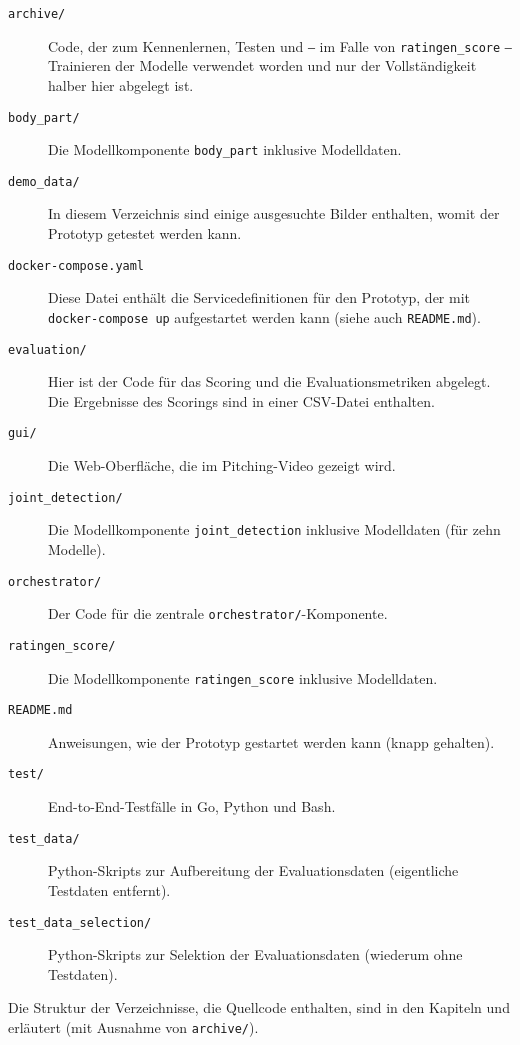 \begin{description}
    \item[\texttt{archive/}] Code, der zum Kennenlernen, Testen und ‒ im Falle von \texttt{ratingen\_score} ‒ Trainieren der Modelle verwendet worden und nur der Vollständigkeit halber hier abgelegt ist.
    \item[\texttt{body\_part/}] Die Modellkomponente \texttt{body\_part} inklusive Modelldaten.
    \item[\texttt{demo\_data/}] In diesem Verzeichnis sind einige ausgesuchte Bilder enthalten, womit der Prototyp getestet werden kann.
    \item[\texttt{docker-compose.yaml}] Diese Datei enthält die Servicedefinitionen für den Prototyp, der mit \texttt{docker-compose up} aufgestartet werden kann (siehe auch \texttt{README.md}).
    \item[\texttt{evaluation/}] Hier ist der Code für das Scoring und die Evaluationsmetriken abgelegt. Die Ergebnisse des Scorings sind in einer CSV-Datei enthalten.
    \item[\texttt{gui/}] Die Web-Oberfläche, die im Pitching-Video gezeigt wird.
    \item[\texttt{joint\_detection/}] Die Modellkomponente \texttt{joint\_detection} inklusive Modelldaten (für zehn Modelle).
    \item[\texttt{orchestrator/}] Der Code für die zentrale \texttt{orchestrator/}-Komponente.
    \item[\texttt{ratingen\_score/}] Die Modellkomponente \texttt{ratingen\_score} inklusive Modelldaten.
    \item[\texttt{README.md}] Anweisungen, wie der Prototyp gestartet werden kann (knapp gehalten).
    \item[\texttt{test/}] End-to-End-Testfälle in Go, Python und Bash.
    \item[\texttt{test\_data/}] Python-Skripts zur Aufbereitung der Evaluationsdaten (eigentliche Testdaten entfernt).
    \item[\texttt{test\_data\_selection/}] Python-Skripts zur Selektion der Evaluationsdaten (wiederum ohne Testdaten).
\end{description}

Die Struktur der Verzeichnisse, die Quellcode enthalten, sind in den Kapiteln  und  erläutert (mit Ausnahme von \texttt{archive/}).

\clearpage
